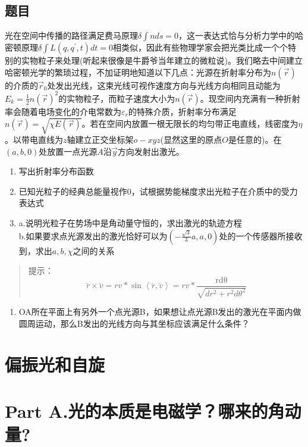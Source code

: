 \documentclass[utf8]{ctexart}
\begin{document}
\subsection{题目}
光在空间中传播的路径满足费马原理$\delta \int{nds=0}$，这一表达式恰与分析力学中的哈密顿原理$\delta\int{L(q,q^\prime,t)}dt=0$相类似，因此有些物理学家会把光类比成一个个特别的实物粒子来处理(听起来很像是牛爵爷当年建立的微粒说)。我们略去中间建立哈密顿光学的繁琐过程，不加证明地知道以下几点：光源在折射率分布为$n(\vec{r})$的介质的${\vec{r}}_0$处发出光线，这束光线可视作速度方向与光线方向相同且动能为$E_k=\frac{1}{2}n(\vec{r})^2$的实物粒子，而粒子速度大小为$n(\vec{r})$。现空间内充满有一种折射率会随着电场变化的介电常数为$\varepsilon_r$的特殊介质，折射率分布满足$n(\vec{r})=\sqrt{\chi E(\vec{r})}$。若在空间内放置一根无限长的均匀带正电直线，线密度为$\eta$。以带电直线为$z$轴建立正交坐标架$o-xyz$(显然这里的原点$O$是任意的)。在$(a,b,0)$处放置一点光源$A$沿$\vec{y}$方向发射出激光。
\begin{enumerate}
\def\labelenumi{(\arabic{enumi})}
\item
  写出折射率分布函数
\item
  已知光粒子的经典总能量视作$0$，试根据势能梯度求出光粒子在介质中的受力表达式
\item
  a.说明光粒子在势场中是角动量守恒的，求出激光的轨迹方程\\
  b.如果要求点光源发出的激光恰好可以为$(-\frac{\sqrt3}{3}a,a,0)$处的一个传感器所接收到，求出$a,b,\chi$之间的关系
\end{enumerate}

\begin{quote}
提示：\[\overset{⃑}{r} \times \overset{⃑}{v} = rv*\sin\left\langle \overset{⃑}{r},\overset{⃑}{v} \right\rangle = rv*\frac{\text{rdθ}}{\sqrt{dr^{2} + r^{2}d\theta^{2}}}\]
\end{quote}

\begin{enumerate}
\def\labelenumi{(\arabic{enumi})}
\setcounter{enumi}{3}
\item
  OA所在平面上有另外一个点光源B，如果想让点光源B发出的激光在平面内做圆周运动，那么B发出的光线方向与其坐标应该满足什么条件？
\end{enumerate}
\section{偏振光和自旋}

\section*{Part A.光的本质是电磁学？哪来的角动量?}
\end{document}
